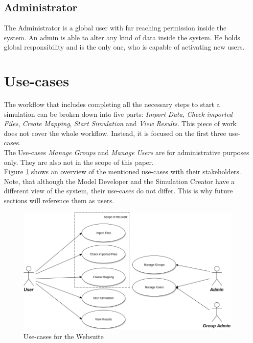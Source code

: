 \subsection{Administrator}
The Administrator is a global user with far reaching permission inside the system. An admin is able to alter any kind of data inside the system. He holds global responsibility and is the only one, who is capable of activating new users.


\section{Use-cases}
The workflow that includes completing all the necessary steps to start a simulation can be broken down into five parts: \textit{Import Data}, \textit{Check imported Files}, \textit{Create Mapping}, \textit{Start Simulation} and \textit{View Results}. This piece of work does not cover the whole workflow. Instead, it is focused on the first three use-cases.\\
The Use-cases \textit{Manage Groups} and \textit{Manage Users} are for administrative purposes only. They are also not in the scope of this paper.\\
Figure \ref{fig:use-cases} shows an overview of the mentioned use-cases with their stakeholders. Note, that although the Model Developer and the Simulation Creator have a different view of the system, their use-cases do not differ. This is why future sections will reference them as users.
\begin{figure}[H]
	\centering\includegraphics[width=1\textwidth]{res/Use-Cases_reduced}
	\caption{Use-cases for the Websuite}
	\label{fig:use-cases}
\end{figure}

